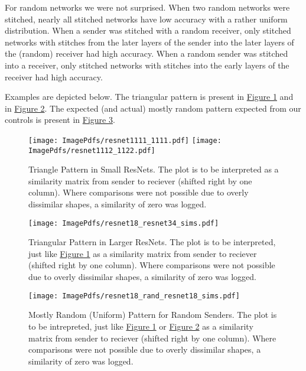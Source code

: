 \documentclass{article} %
\begin{document}
For random networks we were not surprised.
When two random networks were stitched, nearly all stitched networks have low
accuracy with a rather uniform distribution. When
a sender was stitched with a random receiver, only stitched networks with stitches from the
later layers of the sender into the later layers of the (random)
receiver had high accuracy. When a random sender was stitched
into a receiver, only stitched networks with stitches into the early layers of the
receiver had high accuracy.

Examples are depicted below. The triangular pattern is present in \hyperref[Figure2]{Figure 1} and in \hyperref[Figure3]{Figure 2}.
The expected (and actual) mostly random pattern expected from our controls is present in \hyperref[Figure4]{Figure 3}.

\label{Figure2}
\begin{center}
   \begin{figure}[H]
      \centering
      \texttt{[image: ImagePdfs/resnet1111\_1111.pdf]}
      \texttt{[image: ImagePdfs/resnet1112\_1122.pdf]}
      \caption{Triangle Pattern in Small ResNets.
      The plot is to be interpreted as a similarity matrix from sender to reciever (shifted right by one column).
      Where comparisons were not possible due to overly dissimilar shapes, a similarity of zero was logged.}
   \end{figure}
\end{center}

\label{Figure3}
\begin{center}
   \begin{figure}[H]
      \centering
      \texttt{[image: ImagePdfs/resnet18\_resnet34\_sims.pdf]}
      \caption*{Triangular Pattern in Larger ResNets.
      The plot is to be interpreted, just like \hyperref[Figure2]{Figure 1} as a similarity matrix from sender to reciever
      (shifted right by one column).
      Where comparisons were not possible due to overly dissimilar shapes, a similarity of zero was logged.}
   \end{figure}
\end{center}

\label{Figure4}
\begin{center}
   \begin{figure}[H]
      \centering
      \texttt{[image: ImagePdfs/resnet18\_rand\_resnet18\_sims.pdf]}
      \caption*{Mostly Random (Uniform) Pattern for Random Senders. The plot is to be intrepreted, just like
      \hyperref[Figure2]{Figure 1} or \hyperref[Figure3]{Figure 2}
      as a similarity matrix from sender to reciever (shifted right by one column).
      Where comparisons were not possible due to overly dissimilar shapes, a similarity of zero was logged.}
   \end{figure}
\end{center}
\end{document}
